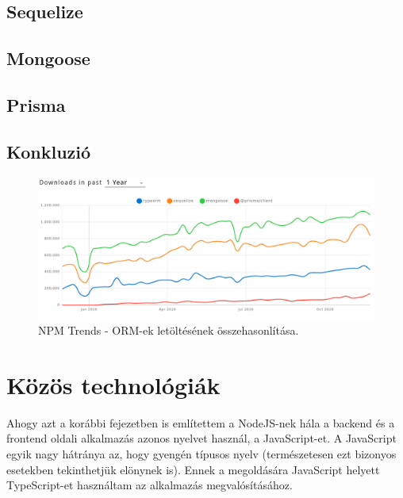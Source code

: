 \subsection{Sequelize}

\subsection{Mongoose}

\subsection{Prisma}

\subsection{Konkluzió}

\begin{figure}[!ht]
  \centering
  \includegraphics[width=150mm, keepaspectratio]{figures/orm_npm_trends.png}
  \caption{NPM Trends - ORM-ek letöltésének összehasonlítása.}
  \label{fig:ORMTrends}
\end{figure}

\section{Közös technológiák}
Ahogy azt a korábbi fejezetben is említettem a NodeJS-nek hála a backend és a frontend oldali alkalmazás azonos nyelvet használ, a JavaScript-et.
A JavaScript egyik nagy hátránya az, hogy gyengén típusos nyelv (természetesen ezt bizonyos esetekben tekinthetjük elönynek is). Ennek a megoldására JavaScript helyett TypeScript-et használtam az alkalmazás megvalósításához.

